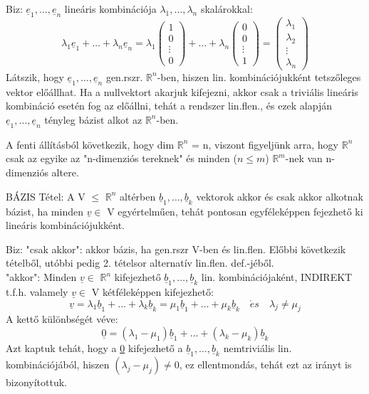 \documentclass[]{article}
\newcommand{\Rn}[1]{$\mathbb{R}^{#1}$}
\newcommand{\Und}[1]{\underline{#1}}
\begin{document}
\begin{leftbar}
Biz: $\Und{e}_1,\ldots,\Und{e}_n$ lineáris kombinációja $\lambda_1,\ldots,\lambda_n$ skalárokkal:
$$\lambda_1\Und{e}_1+\ldots+\lambda_n\Und{e}_n = \lambda_1\begin{pmatrix}
1\\0\\\vdots\\0
\end{pmatrix}+\ldots+
\lambda_n\begin{pmatrix}
0\\0\\\vdots\\1
\end{pmatrix} = \begin{pmatrix}
\lambda_1\\\lambda_2\\\vdots\\\lambda_n
\end{pmatrix}$$
Látszik, hogy $\Und{e}_1,\ldots,\Und{e}_n$ gen.rszr. \Rn{n}-ben, hiszen lin. kombinációjukként tetszőleges vektor előállhat. Ha a nullvektort akarjuk kifejezni, akkor csak a triviális lineáris kombináció esetén fog az előállni, tehát a rendszer lin.flen., és ezek alapján $\Und{e}_1,\ldots,\Und{e}_n$ tényleg bázist alkot az \Rn{n}-ben.
\end{leftbar}
A fenti állításból következik, hogy dim \Rn{n} = n, viszont figyeljünk arra, hogy \Rn{n} csak az egyike az "n-dimenziós tereknek" és minden ($n \leq m$) \Rn{m}-nek van n-dimenziós altere.
\begin{framed}
BÁZIS Tétel: A V $\leq$ \Rn{n} altérben $\Und{b}_1,\ldots,\Und{b}_k$ vektorok akkor és csak akkor alkotnak bázist, ha minden $\Und{v} \in$ V egyértelműen, tehát pontosan egyféleképpen fejezhető ki lineáris kombinációjukként.
\end{framed}
\begin{leftbar}
Biz: "csak akkor": akkor bázis, ha gen.rszr V-ben és lin.flen. Előbbi következik tételből, utóbbi pedig 2. tételsor alternatív lin.flen. def.-jéből.\\
"akkor": Minden $\Und{v} \in$ \Rn{n} kifejezhető $\Und{b}_1,\ldots,\Und{b}_k$ lin. kombinációjaként, INDIREKT t.f.h. valamely $\Und{v} \in$ V kétféleképpen kifejezhető:
$$\Und{v} = \lambda_1\Und{b}_1 + \ldots + \lambda_k\Und{b}_k = \mu_1\Und{b}_1 + \ldots + \mu_k\Und{b}_k\quad \acute{e}s\quad \lambda_j \neq \mu_j$$A kettő különbségét véve:
$$\Und{0} = (\lambda_1 - \mu_1)\Und{b}_1 +\ldots +  (\lambda_k - \mu_k)\Und{b}_k$$
Azt kaptuk tehát, hogy a \Und{0} kifejezhető a $\Und{b}_1,\ldots,\Und{b}_k$ nemtriviális lin. kombinációjából, hiszen $(\lambda_j - \mu_j) \neq 0$, ez ellentmondás, tehát ezt az irányt is bizonyítottuk.
\end{leftbar}
\end{document}
